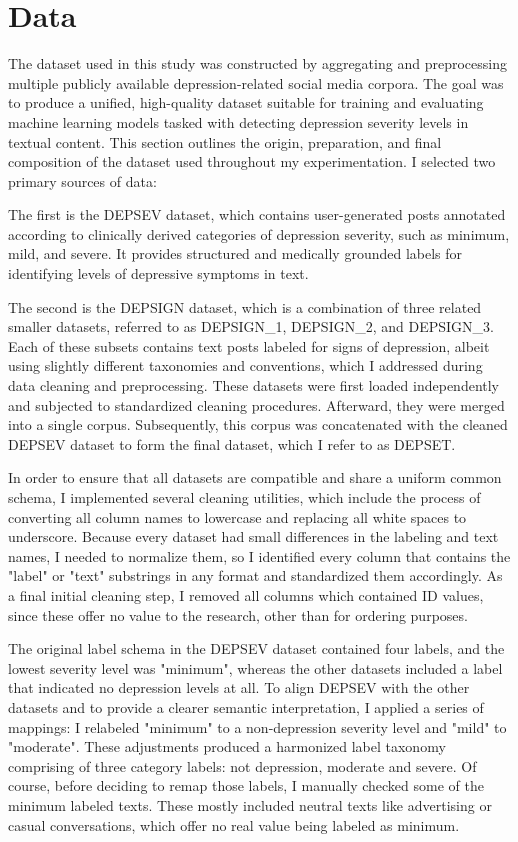 \section{Data}

The dataset used in this study was constructed by aggregating and preprocessing multiple publicly available depression-related social media corpora. The goal was to produce a unified, high-quality dataset suitable for training and evaluating machine learning models tasked with detecting depression severity levels in textual content. This section outlines the origin, preparation, and final composition of the dataset used throughout my experimentation. I selected two primary sources of data:

The first is the DEPSEV dataset, which contains user-generated posts annotated according to clinically derived categories of depression severity, such as minimum, mild, and severe. It provides structured and medically grounded labels for identifying levels of depressive symptoms in text.

The second is the DEPSIGN dataset, which is a combination of three related smaller datasets, referred to as DEPSIGN\_1, DEPSIGN\_2, and DEPSIGN\_3. Each of these subsets contains text posts labeled for signs of depression, albeit using slightly different taxonomies and conventions, which I addressed during data cleaning and preprocessing. These datasets were first loaded independently and subjected to standardized cleaning procedures. Afterward, they were merged into a single corpus. Subsequently, this corpus was concatenated with the cleaned DEPSEV dataset to form the final dataset, which I refer to as DEPSET.

In order to ensure that all datasets are compatible and share a uniform common schema, I implemented several cleaning utilities, which include the process of converting all column names to lowercase and replacing all white spaces to underscore. Because every dataset had small differences in the labeling and text names, I needed to normalize them, so I identified every column that contains the "label" or "text" substrings in any format and standardized them accordingly. As a final initial cleaning step, I removed all columns which contained ID values, since these offer no value to the research, other than for ordering purposes.

The original label schema in the DEPSEV dataset contained four labels, and the lowest severity level was "minimum", whereas the other datasets included a label that indicated no depression levels at all. To align DEPSEV with the other datasets and to provide a clearer semantic interpretation, I applied a series of mappings: I relabeled "minimum" to a non-depression severity level and "mild" to "moderate". These adjustments produced a harmonized label taxonomy comprising of three category labels: not depression, moderate and severe. Of course, before deciding to remap those labels, I manually checked some of the minimum labeled texts. These mostly included neutral texts like advertising or casual conversations, which offer no real value being labeled as minimum.

